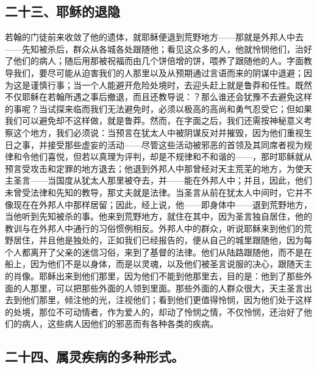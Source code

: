 \subsection{二十三、耶稣的退隐}

若翰的门徒前来收敛了他的遗体，就耶稣便退到荒野地方——那就是外邦人中去——先知被杀后，群众从各城各处跟随他；看见这众多的人，他就怜悯他们，治好了他们的病人；随后用那被祝福而由几个饼倍增的饼，喂养了跟随他的人。字面教导我们，要尽可能从迫害我们的人那里以及从预期通过言语而来的阴谋中退避；因为这是谨慎行事；当一个人能避开危险处境时，去迎头赶上就是鲁莽和任性。既然不仅耶稣在若翰所遇之事后撤退，而且还教导说：？那么谁还会犹豫不去避免这样的事呢？当试探来临而我们无法避免时，必须以极高的高尚和勇气忍受它；但如果我们可以避免却不这样做，就是鲁莽。然而，在字面之后，我们还需按神秘意义考察这个地方，我们必须说：当预言在犹太人中被阴谋反对并摧毁，因为他们重视生日之事，并接受那些虚妄的活动——尽管这些活动被邪恶的首领及其同席者视为规律和令他们喜悦，但若以真理为评判，却是不规律和不和谐的——，那时耶稣就从预言受攻击和定罪的地方退去；他退到外邦人中那曾经对天主荒芜的地方，为使天主圣言——当国度从犹太人那里被夺去，并——能在外邦人中；并且，因此，他们未曾受法律和先知的教导，那丈夫就是法律。当圣言从前在犹太人中间时，它并不像现在在外邦人中那样居留；因此，经上说，他——即身体中——退到荒野地方，当他听到先知被杀的事。他来到荒野地方，就住在其中，因为圣言独自居住，他的教训与在外邦人中通行的习俗惯例相反。外邦人中的群众，听说耶稣来到他们的荒野居住，并且他是独处的，正如我们已经报告的，便从自己的城里跟随他，因为每个人都离开了父亲的迷信习俗，来到了基督的法律。他们从陆路跟随他，而不是在船上，因为他们不是以身体，而是以灵魂，以及他们被圣言说服的决心，跟随天主的肖像。耶稣出来到他们那里，因为他们不能到他那里去，目的是：他到了那些外面的人那里，可以把那些外面的人领到里面。那些外面的人群众很大，天主圣言出去到他们那里，倾注他的光，注视他们；看到他们更值得怜悯，因为他们处于这样的处境，那位不可动情者，作为爱人的，却动了怜悯之情，不仅怜悯，还治好了他们的病人，这些病人因他们的邪恶而有各种各类的疾病。\par


\subsection{二十四、属灵疾病的多种形式。}

